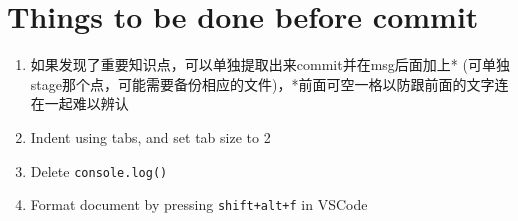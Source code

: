 \documentclass[a4paper, 12pt]{article}
\begin{document}
\section{Things to be done before commit}
\begin{enumerate}

\item 如果发现了重要知识点，可以单独提取出来commit并在msg后面加上* (可单独stage那个点，可能需要备份相应的文件)，*前面可空一格以防跟前面的文字连在一起难以辨认

\item Indent using tabs, and set tab size to 2

\item Delete \verb|console.log()|

\item Format document by pressing \verb|shift+alt+f| in VSCode

\end{enumerate}
\end{document}
